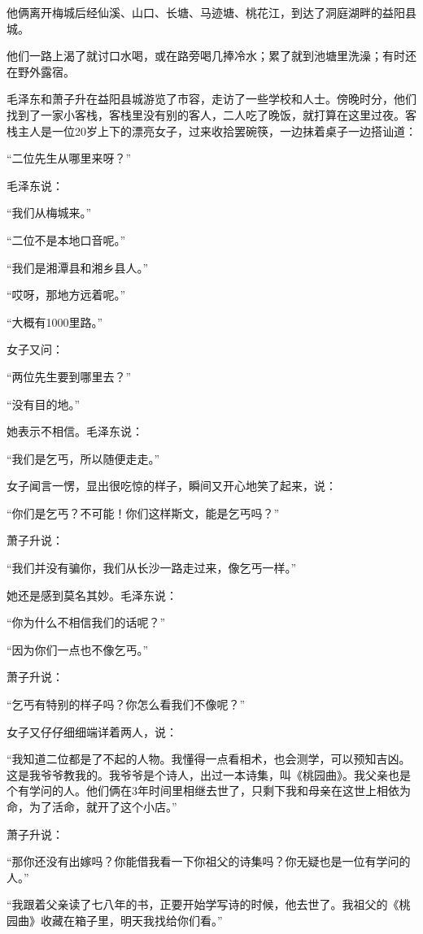 \documentclass[../../dazhuan.tex]{subfiles}
\begin{document}
他俩离开梅城后经仙溪、山口、长塘、马迹塘、桃花江，到达了洞庭湖畔的益阳县城。

他们一路上渴了就讨口水喝，或在路旁喝几捧冷水；累了就到池塘里洗澡；有时还在野外露宿。

毛泽东和萧子升在益阳县城游览了市容，走访了一些学校和人士。傍晚时分，他们找到了一家小客栈，客栈里没有别的客人，二人吃了晚饭，就打算在这里过夜。客栈主人是一位20岁上下的漂亮女子，过来收拾罢碗筷，一边抹着桌子一边搭讪道：

“二位先生从哪里来呀？”

毛泽东说：

“我们从梅城来。”

“二位不是本地口音呢。”

“我们是湘潭县和湘乡县人。”

“哎呀，那地方远着呢。”

“大概有1000里路。”

女子又问：

“两位先生要到哪里去？”

“没有目的地。”

她表示不相信。毛泽东说：

“我们是乞丐，所以随便走走。”

女子闻言一愣，显出很吃惊的样子，瞬间又开心地笑了起来，说：

“你们是乞丐？不可能！你们这样斯文，能是乞丐吗？”

萧子升说：

“我们并没有骗你，我们从长沙一路走过来，像乞丐一样。”

她还是感到莫名其妙。毛泽东说：

“你为什么不相信我们的话呢？” 

“因为你们一点也不像乞丐。”

萧子升说：

“乞丐有特别的样子吗？你怎么看我们不像呢？”

女子又仔仔细细端详着两人，说：

“我知道二位都是了不起的人物。我懂得一点看相术，也会测学，可以预知吉凶。这是我爷爷教我的。我爷爷是个诗人，出过一本诗集，叫《桃园曲》。我父亲也是个有学问的人。他们俩在3年时间里相继去世了，只剩下我和母亲在这世上相依为命，为了活命，就开了这个小店。”

萧子升说：

“那你还没有出嫁吗？你能借我看一下你祖父的诗集吗？你无疑也是一位有学问的人。”

“我跟着父亲读了七八年的书，正要开始学写诗的时候，他去世了。我祖父的《桃园曲》收藏在箱子里，明天我找给你们看。”
\end{document}
